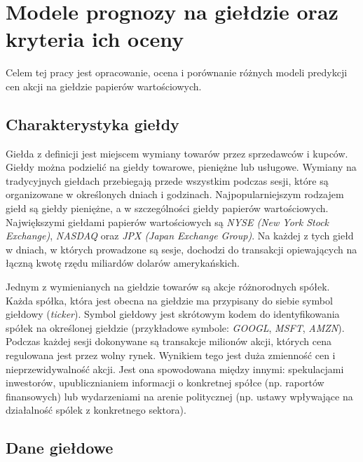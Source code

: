 \documentclass[a4paper, twoside, 11pt, openright]{article}
\newcommand{\fncymain}{%
	\fancyhead[RO]{{\footnotesize \rightmark}}
	\fancyfoot[RO]{\thepage}
	\fancyhead[LE]{{\footnotesize \leftmark}}
	\fancyfoot[LE]{\thepage}
	\fancyfoot[C]{}
	\renewcommand{\headrulewidth}{0.3pt}}
\begin{document}
\fncymain



\cleardoublepage

\tableofcontents

\cleardoublepage

\section{Modele prognozy na giełdzie oraz kryteria ich oceny}

Celem tej pracy jest opracowanie, ocena i porównanie różnych modeli predykcji cen akcji na giełdzie papierów wartościowych.

\subsection{Charakterystyka giełdy}

Giełda z definicji jest miejscem wymiany towarów przez sprzedawców i kupców. Giełdy można podzielić na giełdy towarowe, pieniężne lub usługowe. Wymiany na tradycyjnych giełdach przebiegają przede wszystkim podczas sesji, które są organizowane w określonych dniach i godzinach. Najpopularniejszym rodzajem giełd są giełdy pieniężne, a w szczególności giełdy papierów wartościowych. Największymi giełdami papierów wartościowych są \textit{NYSE (New York Stock Exchange)}\cite{nyse}, \textit{NASDAQ}\cite{nasdaq} oraz \textit{JPX (Japan Exchange Group)}\cite{jpx}. Na każdej z tych giełd w dniach, w których prowadzone są sesje, dochodzi do transakcji opiewających na łączną kwotę rzędu miliardów dolarów amerykańskich.

\bigskip

 Jednym z wymienianych na giełdzie towarów są akcje różnorodnych spółek. Każda spółka, która jest obecna na giełdzie ma przypisany do siebie symbol giełdowy (\textit{ticker}). Symbol giełdowy jest skrótowym kodem do identyfikowania spółek na określonej giełdzie (przykładowe symbole: \textit{GOOGL}, \textit{MSFT}, \textit{AMZN}). Podczas każdej sesji dokonywane są transakcje milionów akcji, których cena regulowana jest przez wolny rynek. Wynikiem tego jest duża zmienność cen i nieprzewidywalność akcji. Jest ona spowodowana między innymi: spekulacjami inwestorów, upublicznianiem informacji o konkretnej spółce (np. raportów finansowych) lub wydarzeniami na arenie politycznej (np. ustawy wpływające na działalność spólek z konkretnego sektora).

\subsection{Dane giełdowe}
\end{document}
